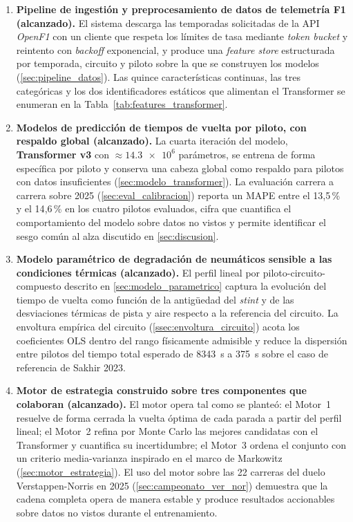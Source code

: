 \begin{enumerate}
    \item \textbf{Pipeline de ingestión y preprocesamiento de datos de telemetría F1 (alcanzado).} El sistema descarga las temporadas solicitadas de la API \textit{OpenF1} con un cliente que respeta los límites de tasa mediante \textit{token bucket} y reintento con \textit{backoff} exponencial, y produce una \textit{feature store} estructurada por temporada, circuito y piloto sobre la que se construyen los modelos (\ref{sec:pipeline_datos}). Las quince características continuas, las tres categóricas y los dos identificadores estáticos que alimentan el Transformer se enumeran en la Tabla~\ref{tab:features_transformer}.

    \item \textbf{Modelos de predicción de tiempos de vuelta por piloto, con respaldo global (alcanzado).} La cuarta iteración del modelo, \textbf{Transformer v3} con $\approx \num{14.3e6}$ parámetros, se entrena de forma específica por piloto y conserva una cabeza global como respaldo para pilotos con datos insuficientes (\ref{sec:modelo_transformer}). La evaluación carrera a carrera sobre 2025 (\ref{sec:eval_calibracion}) reporta un MAPE entre el 13{,}5\,\% y el 14{,}6\,\% en los cuatro pilotos evaluados, cifra que cuantifica el comportamiento del modelo sobre datos no vistos y permite identificar el sesgo común al alza discutido en \ref{sec:discusion}.

    \item \textbf{Modelo paramétrico de degradación de neumáticos sensible a las condiciones térmicas (alcanzado).} El perfil lineal por piloto-circuito-compuesto descrito en \ref{sec:modelo_parametrico} captura la evolución del tiempo de vuelta como función de la antigüedad del \textit{stint} y de las desviaciones térmicas de pista y aire respecto a la referencia del circuito. La envoltura empírica del circuito (\ref{ssec:envoltura_circuito}) acota los coeficientes OLS dentro del rango físicamente admisible y reduce la dispersión entre pilotos del tiempo total esperado de \SI{8343}{\second} a \SI{375}{\second} sobre el caso de referencia de Sakhir 2023.

    \item \textbf{Motor de estrategia construido sobre tres componentes que colaboran (alcanzado).} El motor opera tal como se planteó: el Motor~1 resuelve de forma cerrada la vuelta óptima de cada parada a partir del perfil lineal; el Motor~2 refina por Monte Carlo las mejores candidatas con el Transformer y cuantifica su incertidumbre; el Motor~3 ordena el conjunto con un criterio media-varianza inspirado en el marco de Markowitz (\ref{sec:motor_estrategia}). El uso del motor sobre las 22 carreras del duelo Verstappen-Norris en 2025 (\ref{sec:campeonato_ver_nor}) demuestra que la cadena completa opera de manera estable y produce resultados accionables sobre datos no vistos durante el entrenamiento.


\end{enumerate}
